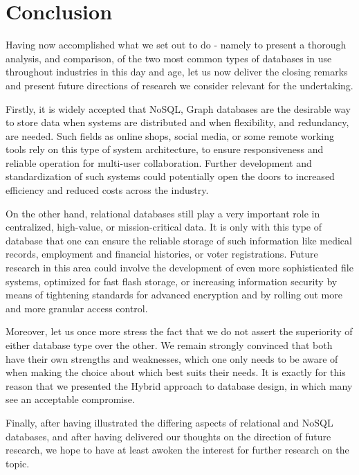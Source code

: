 \documentclass[10pt,        %
               a4paper,     %
               journal,     %
               ]{IEEEtran}
\begin{document}
\section{Conclusion}
Having now accomplished what we set out to do - namely to present a thorough analysis, and comparison, of the two most common types of databases in use throughout industries in this day and age, let us now deliver the closing remarks and present future directions of research we consider relevant for the undertaking. \par
Firstly, it is widely accepted that NoSQL, Graph databases are the desirable way to store data  when systems are distributed and when flexibility, and redundancy, are needed. Such fields as online shops, social media, or some remote working tools rely on this type of system architecture, to ensure responsiveness and reliable operation for multi-user collaboration. Further development and standardization of such systems could potentially open the doors to increased efficiency and reduced costs across the industry. \par
On the other hand, relational databases still play a very important role in centralized, high-value, or mission-critical data. It is only with this type of database that one can ensure the reliable storage of such information like medical records, employment and financial histories, or voter registrations. Future research in this area could involve the development of even more sophisticated file systems, optimized for fast flash storage, or increasing information security by means of tightening standards for advanced encryption and by rolling out more and more granular access control. \par 
Moreover, let us once more stress the fact that we do not assert the superiority of either database type over the other. We remain strongly convinced that both have their own strengths and weaknesses, which one only needs to be aware of when making the choice about which best suits their needs. It is exactly for this reason that we presented the Hybrid approach to database design, in which many see an acceptable compromise. \par
Finally, after having illustrated the differing aspects of relational and NoSQL databases, and after having delivered our thoughts on the direction of future research, we hope to have at least awoken the interest for further research on the topic. 

\end{document}
